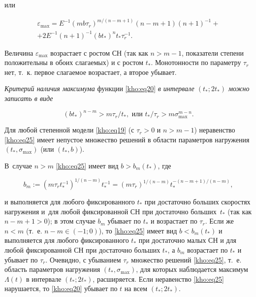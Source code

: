 или

\begin{multline}

\label{kho:eq24}

\varepsilon_{\max}=E^{-1}(mb\tau_r)^{m/(n-m+1)}(n-m+1)(n+1)^{-1}+ \\ +2E^{-1}(n+1)^{-1}(bt_\ast)^nt_\ast\tau_r^{-1}.

\end{multline}

Величина $\varepsilon_{\max}$ возрастает с ростом СН (так как $n>m-1$, показатели степени положительны в обоих слагаемых) и с ростом $t_\ast$. Монотонности по параметру $\tau_r$ нет, т.~к. первое слагаемое возрастает, а второе убывает.



\textit{Критерий наличия максимума} функции \eqref{kho:eq20} \textit{в интервале $(t_\ast;2t_\ast)$ можно записать в виде }

\begin{equation}

\label{kho:eq25}

(bt_\ast)^{n-m}>m\tau_r/t_\ast, \text{ или } t_\ast/\tau_r>m\sigma_{\max}^{m-n}.

\end{equation}

Для любой степенной модели \eqref{kho:eq19} (с $\tau_r>0$ и $n>m-1$) неравенство \eqref{kho:eq25} имеет непустое множество решений в области параметров нагружения $(t_\ast,\sigma_{\max})$ (или $(t_\ast,b)$). 

В~случае $n>m$ \eqref{kho:eq25} имеет вид $b>b_m(t_\ast)$, где 

\begin{equation}

\label{kho:eq26}

b_m:=(m\tau_rt_\ast^{-1})^{1/(n-m)}t_\ast^{-1}=(m\tau_r)^{1/(n-m)}t_\ast^{-(n-m+1)/(n-m)},

\end{equation}

и выполняется для любого фиксированного $t_\ast$ при достаточно больших скоростях нагружения и~для любой фиксированной СН при достаточно больших~$t_\ast$ (так как ${n-m+1>0}$); в этом случае $b_m$ убывает по $t_\ast$ и возрастает по $\tau_r$. Если же $n<m$ (т.~е. $n-m\in(-1;0)$), то \eqref{kho:eq25} имеет вид $b<b_m(t_\ast)$ и выполняется для любого фиксированного $t_\ast$ при достаточно малых СН и для любой фиксированной СН при достаточно больших $t_\ast$, а $b_m$ возрастает по $t_\ast$ и убывает по $\tau_r$. Очевидно, с убыванием $\tau_r$ множество решений \eqref{kho:eq25}, т.~е. область параметров нагружения $(t_\ast,\sigma_{\max})$, для которых наблюдается максимум $\Lambda(t)$ в интервале $(t_\ast;2t_\ast)$, расширяется. Если неравенство \eqref{kho:eq25} нарушается, то \eqref{kho:eq20} убывает по $t$ на всем $(t_\ast;2t_\ast)$.



